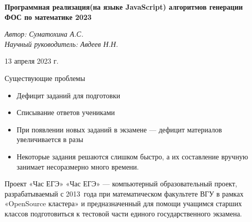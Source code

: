 \documentclass[aspectratio=169]{beamer}
\begin{document}
\begin{frame}
   \begin{center}
    \vspace{1.5cm}
    \Large\textcolor{NordBrightBlue}{\textbf{Программная реализация(на языке JavaScript) алгоритмов генерации ФОС по математике 2023}}\\
        \end{center}
        \vspace{1cm}
        \large\textcolor{NordBlue}{\textit{Автор: Суматохина А.С.}}\\
        \large\textcolor{NordBlue}{\textit{Научный руководитель: Авдеев Н.Н.}}\\
        \vspace{1cm}
        \begin{center}
            13 апреля 2023 г.
        \end{center}
        
\end{frame}

\begin{frame}{Существующие проблемы}
    \begin{itemize}
        \item Дефицит заданий для подготовки
        \item Списывание ответов учениками
        \item При появлении новых заданий в экзамене — дефицит материалов увеличивается в разы
        \item Некоторые задания решаются слишком быстро, а их составление вручную занимает несоразмерно много времени.
    \end{itemize}
\end{frame}

\begin{frame}{Проект «Час ЕГЭ»}
    «Час ЕГЭ» — компьютерный образовательный проект, разрабатываемый с 2013~года при математическом факультете ВГУ в рамках «OpenSource кластера» и предназначенный для помощи учащимся старших классов подготовиться к тестовой части единого государственного экзамена.
\end{frame}
\end{document}
